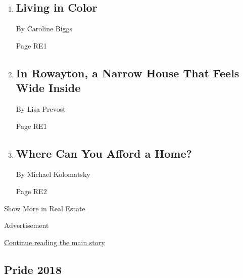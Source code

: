 \begin{enumerate}
\def\labelenumi{\arabic{enumi}.}
\item
  \href{/2018/06/22/realestate/living-in-color.html}{}

  \hypertarget{living-in-color}{%
  \subsection{Living in Color}\label{living-in-color}}

  By Caroline Biggs

  Page RE1
\item
  \href{/2018/06/22/realestate/in-rowayton-a-narrow-house-that-feels-wide-inside.html}{}

  \hypertarget{in-rowayton-a-narrow-house-that-feels-wide-inside}{%
  \subsection{In Rowayton, a Narrow House That Feels Wide
  Inside}\label{in-rowayton-a-narrow-house-that-feels-wide-inside}}

  By Lisa Prevost

  Page RE1
\item
  \href{/2018/06/21/realestate/where-can-you-afford-a-home.html}{}

  \hypertarget{where-can-you-afford-a-home}{%
  \subsection{Where Can You Afford a
  Home?}\label{where-can-you-afford-a-home}}

  By Michael Kolomatsky

  Page RE2
\end{enumerate}

Show More in Real Estate

Advertisement

\protect\hyperlink{after-mid8}{Continue reading the main story}

\hypertarget{pride-2018}{%
\subsection{Pride 2018}\label{pride-2018}}

